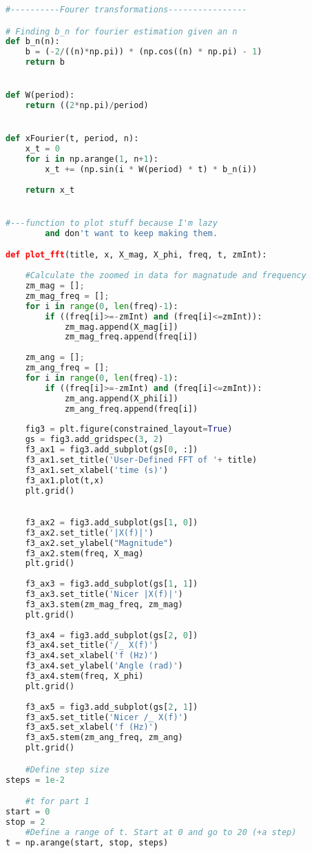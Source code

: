 \documentclass[12pt,a4paper]{article}
\begin{document}
\begin{lstlisting}[language=Python]
#----------Fourer transformations----------------

# Finding b_n for fourier estimation given an n
def b_n(n):
    b = (-2/((n)*np.pi)) * (np.cos((n) * np.pi) - 1)
    return b


def W(period):
    return ((2*np.pi)/period)


def xFourier(t, period, n):
    x_t = 0
    for i in np.arange(1, n+1):
        x_t += (np.sin(i * W(period) * t) * b_n(i))
        
    return x_t


#---function to plot stuff because I'm lazy 
        and don't want to keep making them.

def plot_fft(title, x, X_mag, X_phi, freq, t, zmInt):
    
    #Calculate the zoomed in data for magnatude and frequency
    zm_mag = [];
    zm_mag_freq = [];
    for i in range(0, len(freq)-1):
        if ((freq[i]>=-zmInt) and (freq[i]<=zmInt)):
            zm_mag.append(X_mag[i])
            zm_mag_freq.append(freq[i])
            
    zm_ang = [];
    zm_ang_freq = [];
    for i in range(0, len(freq)-1):
        if ((freq[i]>=-zmInt) and (freq[i]<=zmInt)):
            zm_ang.append(X_phi[i])
            zm_ang_freq.append(freq[i])
    
    fig3 = plt.figure(constrained_layout=True)
    gs = fig3.add_gridspec(3, 2)
    f3_ax1 = fig3.add_subplot(gs[0, :])
    f3_ax1.set_title('User-Defined FFT of '+ title)
    f3_ax1.set_xlabel('time (s)')
    f3_ax1.plot(t,x)
    plt.grid()

    
    f3_ax2 = fig3.add_subplot(gs[1, 0])
    f3_ax2.set_title('|X(f)|')
    f3_ax2.set_ylabel("Magnitude")
    f3_ax2.stem(freq, X_mag)
    plt.grid()
    
    f3_ax3 = fig3.add_subplot(gs[1, 1])
    f3_ax3.set_title('Nicer |X(f)|')
    f3_ax3.stem(zm_mag_freq, zm_mag)
    plt.grid()
    
    f3_ax4 = fig3.add_subplot(gs[2, 0])
    f3_ax4.set_title('/_ X(f)')
    f3_ax4.set_xlabel('f (Hz)')
    f3_ax4.set_ylabel('Angle (rad)')
    f3_ax4.stem(freq, X_phi)
    plt.grid()
    
    f3_ax5 = fig3.add_subplot(gs[2, 1])
    f3_ax5.set_title('Nicer /_ X(f)')
    f3_ax5.set_xlabel('f (Hz)')
    f3_ax5.stem(zm_ang_freq, zm_ang)
    plt.grid()

    #Define step size
steps = 1e-2

    #t for part 1
start = 0
stop = 2
    #Define a range of t. Start at 0 and go to 20 (+a step)
t = np.arange(start, stop, steps)


\end{lstlisting}
\end{document}
